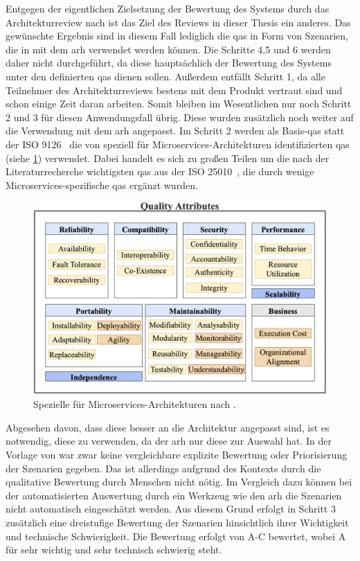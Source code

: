 Entgegen der eigentlichen Zielsetzung der Bewertung des Systems durch das Architekturreview nach  ist das Ziel des Reviews in dieser Thesis ein anderes.
Das gewünschte Ergebnis sind in diesem Fall lediglich die \glspl{qa} in Form von Szenarien, die in mit dem \gls{arh} verwendet werden können.
Die Schritte 4,5 und 6 werden daher nicht durchgeführt, da diese hauptsächlich der Bewertung des Systems unter den definierten \glspl{qa} dienen sollen.
Außerdem entfällt Schritt 1, da alle Teilnehmer des Architekturreviews bestens mit dem Produkt vertraut sind und schon einige Zeit daran arbeiten.
Somit bleiben im Wesentlichen nur noch Schritt 2 und 3 für diesen Anwendungsfall übrig.
Diese wurden zusätzlich noch weiter auf die Verwendung mit dem \gls{arh} angepasst.
Im Schritt 2 werden als Basis-\glspl{qa} statt der ISO 9126~\cite{ISO-9126} die von  speziell für Microservices-Architekturen identifizierten \glspl{qa} (siehe \cref{fig:qas}) verwendet.
Dabei handelt es sich zu großen Teilen um die nach der Literaturrecherche wichtigsten \glspl{qa} aus der ISO 25010~\cite{ISO-25010}, die durch wenige Microservices-spezifische \glspl{qa} ergänzt wurden.
\begin{figure}
	\centering
	\includegraphics[width=\textwidth]{figures/qas}
	\caption[Spezielle  für Microservices-Architekturen]{
		Spezielle  für Microservices-Architekturen nach .
	}
	\label{fig:qas}
\end{figure}
Abgesehen davon, dass diese besser an die Architektur angepasst sind, ist es notwendig, diese zu verwenden, da der \gls{arh} nur diese zur Auswahl hat.
In der Vorlage von  war zwar keine vergleichbare explizite Bewertung oder Priorisierung der Szenarien gegeben.
Das ist allerdings aufgrund des Kontexts durch die qualitative Bewertung durch Menschen nicht nötig.
Im Vergleich dazu können bei der automatisierten Auswertung durch ein Werkzeug wie den \gls{arh} die Szenarien nicht automatisch eingeschätzt werden.
Aus diesem Grund erfolgt in Schritt 3 zusätzlich eine dreistufige Bewertung der Szenarien hinsichtlich ihrer Wichtigkeit und technische Schwierigkeit.
Die Bewertung erfolgt von A-C bewertet, wobei A für sehr wichtig und sehr technisch schwierig steht.

